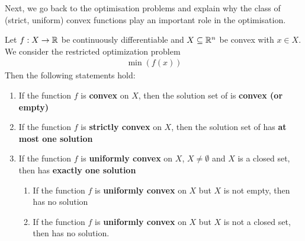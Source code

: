Next, we go back to the optimisation problems and explain why the class of (strict, uniform) convex functions play an important role in the optimisation. 
\begin{satz} \label{theorem:4}
	Let $f:X\rightarrow\mathbb{R}$ be continuously differentiable and $X\subseteq\mathbb{R}^n$ be convex with $x\in X$. We consider the restricted optimization problem
	\begin{align}
	\min (f(x))  \label{theorem:5:opt}
	\end{align}	
	Then the following statements hold:
	\begin{enumerate}
		\item If the function $f$ is \textbf{convex} on $X$, then the solution set of  is \textbf{convex (or empty)}
		\item If the function $f$ is \textbf{strictly convex} on $X$, then the solution set of  has \textbf{at most one solution} 
		\item If the function $f$ is \textbf{uniformly convex} on $X$, $X \neq \emptyset$ and $X$ is a closed set, then  has \textbf{exactly one solution}
		\begin{enumerate}
			\item If the function $f$ is \textbf{uniformly convex} on $X$ but $X$ is not empty, then  has no solution
			\item If the function $f$ is \textbf{uniformly convex} on $X$ but $X$ is not a closed set, then  has no solution.
		\end{enumerate}\subitem 
	\end{enumerate}
\end{satz}

